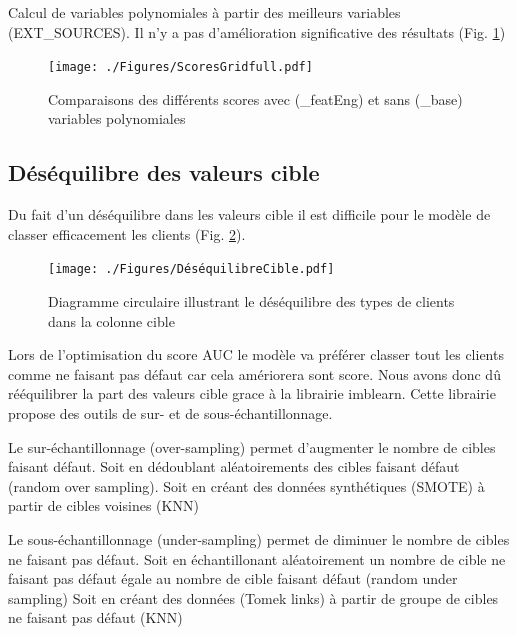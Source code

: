 \documentclass[12pt, a4paper]{article}
\begin{document}
Calcul de variables polynomiales à partir des meilleurs variables (EXT\_SOURCES).
Il n'y a pas d'amélioration significative des résultats (Fig. \ref{fig:ScoresGridFull})

\begin{figure}[h]
    \begin{center}
        \texttt{[image: ./Figures/ScoresGridfull.pdf]}
    \end{center}
    \caption{Comparaisons des différents scores avec (\_featEng) et sans (\_base) variables polynomiales}
    \label{fig:ScoresGridFull}
\end{figure}

\subsection{Déséquilibre des valeurs cible}

Du fait d'un déséquilibre dans les valeurs cible il est difficile pour le modèle de classer efficacement les clients (Fig. \ref{fig:DéséquilibreCible}).

\begin{figure}[h]
    \begin{center}
        \texttt{[image: ./Figures/DéséquilibreCible.pdf]}
    \end{center}
    \caption{Diagramme circulaire illustrant le déséquilibre des types de clients dans la colonne cible}
    \label{fig:DéséquilibreCible}
\end{figure}

Lors de l'optimisation du score AUC le modèle va préférer classer tout les clients comme ne faisant pas défaut car cela amériorera sont score.
Nous avons donc dû rééquilibrer la part des valeurs cible grace à la librairie imblearn.
Cette librairie propose des outils de sur- et de sous-échantillonnage.

Le sur-échantillonnage (over-sampling) permet d'augmenter le nombre de cibles faisant défaut.
Soit en dédoublant aléatoirements des cibles faisant défaut (random over sampling).
Soit en créant des données synthétiques (SMOTE) à partir de cibles voisines (KNN)

Le sous-échantillonnage (under-sampling) permet de diminuer le nombre de cibles ne faisant pas défaut.
Soit en échantillonant aléatoirement un nombre de cible ne faisant pas défaut égale au nombre de cible faisant défaut (random under sampling)
Soit en créant des données (Tomek links) à partir de groupe de cibles ne faisant pas défaut (KNN)
\end{document}
